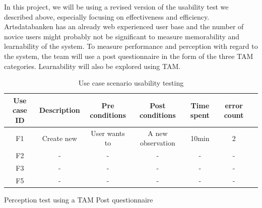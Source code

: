 In this project, we will be using a revised version of the usability test we described above, especially focusing on effectiveness and efficiency. Artsdatabanken has an already web experienced user base and the number of novice users might probably not be significant to measure memorability and learnability of the system.
To measure performance and perception with regard to the system, the team will use a post questionnaire in the form of the three TAM categories. Learnability will also be explored using TAM.

\begin{table}[ht]
\caption{Use case scenario usability testing\cite{tam:doc5}} %
\centering %

\begin{tabular}{|c|c|c|c|c|c|p{3cm}|} %
\hline\hline %
Use case ID & Description & Pre conditions & Post conditions & Time spent & error count \\

\hline %
F1 & Create new  & User wants to  & A new observation  & 10min & 2 \\
\hline
F2 & - & - & - & - & - \\
F3 & - & - & - & - & -\\
F5 & - & - & - & - & -\\
\hline %
\end{tabular}
\label{table:nonlin} %
\end{table}

Perception test using a TAM Post questionnaire\cite{tam:doc4}\cite{tam:doc6}

